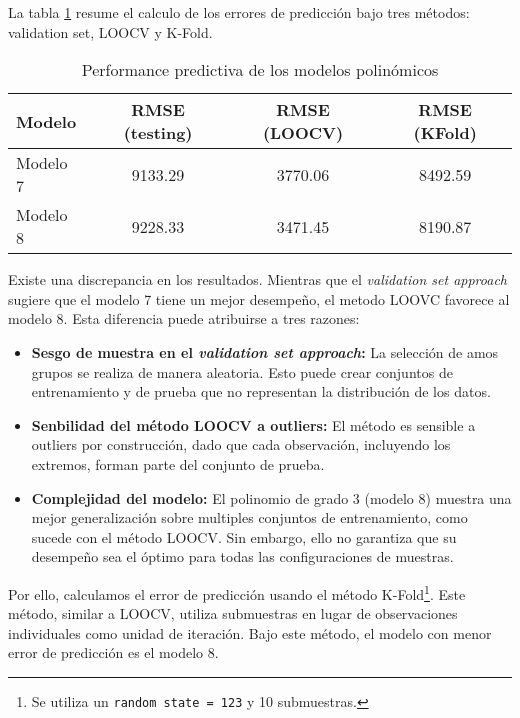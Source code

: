 \documentclass[11pt,oneside]{article}
\newcommand{\code}{\texttt}
\begin{document}
La tabla \ref{tab:comparacion} resume el calculo de los errores de predicción bajo tres métodos: validation set, LOOCV y K-Fold. 

	\begin{table}[H]
		\centering
        \caption{Performance predictiva de los modelos polinómicos}
		\begin{tabular}{lccc}
            \hline
            \textbf{Modelo} & \textbf{RMSE (testing)} & \textbf{RMSE (LOOCV)} & \textbf{RMSE (KFold)} \\ \hline
            Modelo 7        & 9133.29                & 3770.06               & 8492.59               \\
            Modelo 8        & 9228.33                & 3471.45               & 8190.87               \\ \hline
    \end{tabular}
		\label{tab:comparacion}
	\end{table}


Existe una discrepancia en los resultados. Mientras que el \textit{validation set approach} sugiere que el modelo 7 tiene un mejor desempeño, el metodo LOOVC favorece al modelo 8. Esta diferencia puede atribuirse a tres razones:
\begin{itemize}
    \item \textbf{Sesgo de muestra en el \textit{validation set approach}:} La selección de amos grupos se realiza de manera aleatoria. Esto puede crear conjuntos de entrenamiento y de prueba que no representan la distribución de los datos. 
    \item \textbf{Senbilidad del método LOOCV a outliers:} El método es sensible a outliers por construcción, dado que cada observación, incluyendo los extremos, forman parte del conjunto de prueba.
    \item \textbf{Complejidad del modelo:} El polinomio de grado 3 (modelo 8) muestra una mejor generalización sobre multiples conjuntos de entrenamiento, como sucede con el método LOOCV. Sin embargo, ello no garantiza que su desempeño sea el óptimo para todas las configuraciones de muestras.
\end{itemize}


Por ello, calculamos el error de predicción usando el método K-Fold\footnote{Se utiliza un \code{random state = 123} y 10 submuestras.}. Este método, similar a LOOCV, utiliza submuestras en lugar de observaciones individuales como unidad de iteración. Bajo este método, el modelo con menor error de predicción es el modelo 8.
\end{document}
